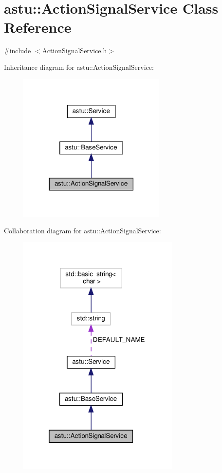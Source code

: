 \hypertarget{classastu_1_1ActionSignalService}{}\section{astu\+:\+:Action\+Signal\+Service Class Reference}
\label{classastu_1_1ActionSignalService}


{\ttfamily \#include $<$Action\+Signal\+Service.\+h$>$}



Inheritance diagram for astu\+:\+:Action\+Signal\+Service\+:\nopagebreak
\begin{figure}[H]
\begin{center}
\leavevmode
\includegraphics[width=209pt]{classastu_1_1ActionSignalService__inherit__graph}
\end{center}
\end{figure}


Collaboration diagram for astu\+:\+:Action\+Signal\+Service\+:\nopagebreak
\begin{figure}[H]
\begin{center}
\leavevmode
\includegraphics[width=229pt]{classastu_1_1ActionSignalService__coll__graph}
\end{center}
\end{figure}
